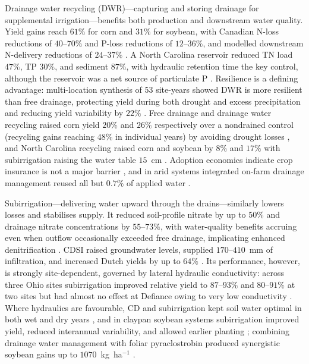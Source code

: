 Drainage water recycling (DWR)---capturing and storing drainage for
supplemental irrigation---benefits both production and downstream water
quality. Yield gains reach $61\%$ for corn and $31\%$ for soybean, with
Canadian N-loss reductions of $40$--$70\%$ and P-loss reductions of
$12$--$36\%$, and modelled downstream N-delivery reductions of $24$--$37\%$
\parencite{Hay2021}. A North Carolina reservoir reduced TN load $47\%$, TP
$30\%$, and sediment $87\%$, with hydraulic retention time the key control,
although the reservoir was a net source of particulate P
\parencite{Moursi2023,Moursi2022}. Resilience is a defining advantage:
multi-location synthesis of 53 site-years showed DWR is more resilient than
free drainage, protecting yield during both drought and excess precipitation
and reducing yield variability by $22\%$ \parencite{Willison2021}. Free
drainage and drainage water recycling raised corn yield $20\%$ and $26\%$
respectively over a nondrained control (recycling gains reaching $48\%$ in
individual years) by avoiding drought losses \parencite{Kaur2021}, and North
Carolina recycling
raised corn and soybean by $8\%$ and $17\%$ with subirrigation raising the
water table $15$~cm \parencite{Moursi2024}. Adoption economics indicate crop
insurance is not a major barrier \parencite{Sellars2022}, and in arid systems
integrated on-farm drainage management reused all but $0.7\%$ of applied water
\parencite{Ayars2014,Kosari2024}.

Subirrigation---delivering water upward through the drains---similarly lowers
losses and stabilises supply. It reduced soil-profile nitrate by up to $50\%$
and drainage nitrate concentrations by $55$--$73\%$, with water-quality
benefits accruing even when outflow occasionally exceeded free drainage,
implicating enhanced denitrification \parencite{Elmi2004,Elmi2002,Noory2009}.
CDSI raised groundwater levels, supplied $170$--$410$~mm of infiltration, and
increased Dutch yields by up to $64\%$
\parencite{deWit2022,deWit2024,FAUSEY1995,Almen2021,Madramootoo2007}. Its
performance, however, is strongly site-dependent, governed by lateral hydraulic
conductivity: across three Ohio sites subirrigation improved relative yield to
$87$--$93\%$ and $80$--$91\%$ at two sites but had almost no effect at Defiance
owing to very low conductivity \parencite{Gunn2018,Gunn2019}. Where hydraulics
are favourable, CD and subirrigation kept soil water optimal in both wet and
dry years \parencite{Niaghi2019}, and in claypan soybean systems subirrigation
improved yield, reduced interannual variability, and allowed earlier planting
\parencite{Nelson2011}; combining drainage water management with foliar
pyraclostrobin produced synergistic soybean gains up to $1070$~kg~ha$^{-1}$
\parencite{Nelson2011b}.

